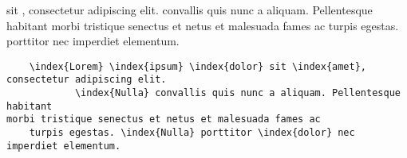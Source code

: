 \documentclass{book}
\begin{document}
\begin{something}
   sit , consectetur adipiscing elit. 
 convallis quis nunc a aliquam. Pellentesque habitant 
morbi tristique senectus et netus et malesuada fames ac 
turpis egestas.  porttitor  nec imperdiet elementum. 
\end{something}

\begin{verbatim}
    \index{Lorem} \index{ipsum} \index{dolor} sit \index{amet}, consectetur adipiscing elit. 
            \index{Nulla} convallis quis nunc a aliquam. Pellentesque habitant 
morbi tristique senectus et netus et malesuada fames ac 
    turpis egestas. \index{Nulla} porttitor \index{dolor} nec imperdiet elementum. 
\end{verbatim}
\end{document}
